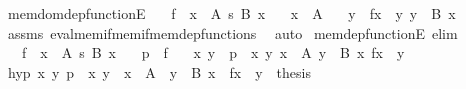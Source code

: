 \begin{isabellebody}
\isanewline
{}\isamarkupfalse%
\ mem{\isacharunderscore}{\kern0pt}dom{\isacharunderscore}{\kern0pt}dep{\isacharunderscore}{\kern0pt}functionE{\isacharcolon}{\kern0pt}\isanewline
\ \ \ {\isachardoublequoteopen}f\ {\isasymin}\ {\isacharparenleft}{\kern0pt}x\ {\isasymin}\ A{\isacharparenright}{\kern0pt}\ {\isasymrightarrow}s\ {\isacharparenleft}{\kern0pt}B\ x{\isacharparenright}{\kern0pt}{\isachardoublequoteclose}\isanewline
\ \ \ {\isachardoublequoteopen}x\ {\isasymin}\ A{\isachardoublequoteclose}\isanewline
\ \ \ y\ \ {\isachardoublequoteopen}f{\isacharbackquote}{\kern0pt}x\ {\isacharequal}{\kern0pt}\ y{\isachardoublequoteclose}\ {\isachardoublequoteopen}y\ {\isasymin}\ B\ x{\isachardoublequoteclose}\isanewline
%
\isadelimproof
\ \ %
\endisadelimproof
%
\isatagproof
{}\isamarkupfalse%
\ assms\ eval{\isacharunderscore}{\kern0pt}mem{\isacharunderscore}{\kern0pt}if{\isacharunderscore}{\kern0pt}mem{\isacharunderscore}{\kern0pt}if{\isacharunderscore}{\kern0pt}mem{\isacharunderscore}{\kern0pt}dep{\isacharunderscore}{\kern0pt}functions\ \isamarkupfalse%
\ auto%
\endisatagproof
{\isafoldproof}%
%
\isadelimproof
\isanewline
%
\endisadelimproof
\isanewline
{}\isamarkupfalse%
\ mem{\isacharunderscore}{\kern0pt}dep{\isacharunderscore}{\kern0pt}functionE\ {\isacharbrackleft}{\kern0pt}elim{\isacharbrackright}{\kern0pt}{\isacharcolon}{\kern0pt}\isanewline
\ \ \ {\isachardoublequoteopen}f\ {\isasymin}\ {\isacharparenleft}{\kern0pt}x\ {\isasymin}\ A{\isacharparenright}{\kern0pt}\ {\isasymrightarrow}s\ {\isacharparenleft}{\kern0pt}B\ x{\isacharparenright}{\kern0pt}{\isachardoublequoteclose}\isanewline
\ \ \ {\isachardoublequoteopen}p\ {\isasymin}\ f{\isachardoublequoteclose}\isanewline
\ \ \ x\ y\ \ {\isachardoublequoteopen}p\ {\isacharequal}{\kern0pt}\ {\isasymlangle}x{\isacharcomma}{\kern0pt}\ y{\isasymrangle}{\isachardoublequoteclose}\ {\isachardoublequoteopen}x\ {\isasymin}\ A{\isachardoublequoteclose}\ {\isachardoublequoteopen}y\ {\isasymin}\ B\ x{\isachardoublequoteclose}\ {\isachardoublequoteopen}f{\isacharbackquote}{\kern0pt}x\ {\isacharequal}{\kern0pt}\ y{\isachardoublequoteclose}\isanewline
%
\isadelimproof
%
\endisadelimproof
%
\isatagproof
{}\isamarkupfalse%
\ {\isacharminus}{\kern0pt}\isanewline
\ \ \isamarkupfalse%
\ hyp{\isacharcolon}{\kern0pt}\ {\isachardoublequoteopen}{\isasymAnd}x\ y{\isachardot}{\kern0pt}\ p\ {\isacharequal}{\kern0pt}\ {\isasymlangle}x{\isacharcomma}{\kern0pt}\ y{\isasymrangle}\ {\isasymLongrightarrow}\ x\ {\isasymin}\ A\ {\isasymLongrightarrow}\ y\ {\isasymin}\ B\ x\ {\isasymLongrightarrow}\ f{\isacharbackquote}{\kern0pt}x\ {\isacharequal}{\kern0pt}\ y\ {\isasymLongrightarrow}\ thesis{\isachardoublequoteclose}\isanewline

\end{isabellebody}
